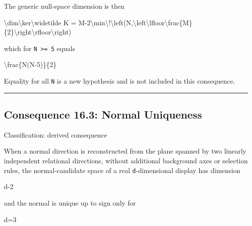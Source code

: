 \documentclass[
  a4paper,
]{article}
\newenvironment{Shaded}{}{}
\newcommand{\NormalTok}[1]{#1}
\begin{document}
The generic null-space dimension is then

\begin{Shaded}
\begin{Highlighting}[]
\NormalTok{\textbackslash{}dim\textbackslash{}ker\textbackslash{}widetilde K}
\NormalTok{=}
\NormalTok{M{-}2\textbackslash{}min\textbackslash{}!\textbackslash{}left(N,\textbackslash{}left\textbackslash{}lfloor\textbackslash{}frac\{M\}\{2\}\textbackslash{}right\textbackslash{}rfloor\textbackslash{}right)}
\end{Highlighting}
\end{Shaded}

which for \texttt{N\ \textgreater{}=\ 5} equals

\begin{Shaded}
\begin{Highlighting}[]
\NormalTok{\textbackslash{}frac\{N(N{-}5)\}\{2\}}
\end{Highlighting}
\end{Shaded}

Equality for all \texttt{N} is a new hypothesis and is not included in
this consequence.

\begin{center}\rule{0.5\linewidth}{0.5pt}\end{center}

\subsection{Consequence 16.3: Normal
Uniqueness}\label{consequence-16.3-normal-uniqueness}

Classification: derived consequence

When a normal direction is reconstructed from the plane spanned by two
linearly independent relational directions, without additional
background axes or selection rules, the normal-candidate space of a real
\texttt{d}-dimensional display has dimension

\begin{Shaded}
\begin{Highlighting}[]
\NormalTok{d{-}2}
\end{Highlighting}
\end{Shaded}

and the normal is unique up to sign only for

\begin{Shaded}
\begin{Highlighting}[]
\NormalTok{d=3}
\end{Highlighting}
\end{Shaded}
\end{document}
